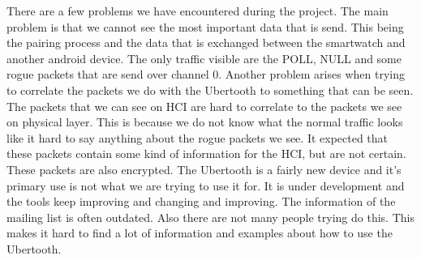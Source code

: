 \label{subsec:problems}
There are a few problems we have encountered during the project. The main problem is that we cannot see the most important data that is send. This being the pairing process and the data that is exchanged between the smartwatch and another android device. The only traffic visible are the POLL, NULL and some rogue packets that are send over channel 0. \pend Another problem arises  when trying to correlate the packets we do with the Ubertooth to something that can be seen. The packets that we can see on HCI are hard to correlate to the packets we see on physical layer. This is because we do not know what the normal traffic looks like it hard to say anything about the rogue packets we see. It expected that these packets contain some kind of information for the HCI, but are not certain. These packets are also encrypted. \pend
The Ubertooth is a fairly new device and it's primary use is not what we are trying to use it for. It is under development and the tools keep improving and changing and improving. The information of the mailing list is often outdated. Also there are not many people trying do this. This makes it hard to find a lot of information and examples about how to use the Ubertooth.%